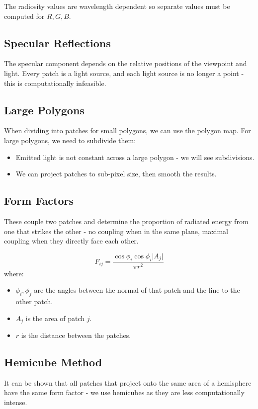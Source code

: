 \documentclass[11pt]{article}
\begin{document}
The radiosity values are wavelength dependent so separate values must be computed for $R, G, B$.

\subsection{Specular Reflections}
The specular component depends on the relative positions of the viewpoint and light.
Every patch is a light source, and each light source is no longer a point - this is computationally infeasible.

\subsection{Large Polygons}
When dividing into patches for small polygons, we can use the polygon map.
For large polygons, we need to subdivide them:
\begin{itemize}
  \item Emitted light is not constant across a large polygon -  we will see subdivisions.
  \item We can project patches to sub-pixel size, then smooth the results.
\end{itemize}

\subsection{Form Factors}
These couple two patches and determine the proportion of radiated energy from one that strikes the other - no coupling when in the same plane, maximal coupling when they directly face each other.

\[
  F_{ij} = \frac{\cos \phi_i \cos \phi_i \lvert A_j \rvert}{\pi r^2} 
\]
where:
\begin{itemize}
  \item $\phi_i, \phi_j$ are the angles between the normal of that patch and the line to the other patch.
  \item $A_j$ is the area of patch $j$.
  \item $r$ is the distance between the patches.
\end{itemize}

\subsection{Hemicube Method}
It can be shown that all patches that project onto the same area of a hemisphere have the same form factor - we use hemicubes as they are less computationally intense.
\end{document}
